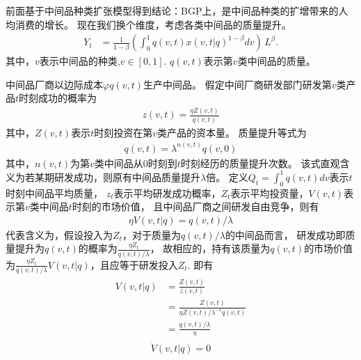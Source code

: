 \documentclass[cn,normal,11pt,black]{elegantnote}
\begin{document}
\begin{definition}[最终品生产函数]
    前面基于中间品种类扩张模型得到结论：BGP上，是中间品种类的扩增带来的人均消费的增长。
    现在我们换个维度，考虑各类中间品的质量提升。
    \begin{align}
        Y_{t} & = \frac{1}{1-\beta} \left(\int_0^1 q(v,t) x(v,t|q)^{1-\beta} dv \right) \, L^\beta.
    \end{align}
    其中，$v$表示中间品的种类,$v \in [0,1]$.
    $q(v,t)$表示第$v$类中间品的质量。    
\end{definition}

\begin{definition}[中间品厂商]
    中间品厂商以边际成本$\varphi q(v,t)$生产中间品。
    假定中间厂商研发部门研发第$v$类产品$t$时刻成功的概率为
    \begin{align}
       z(v,t) = \frac{\eta Z(v,t)}{q(v,t)}
    \end{align}
    其中，$Z(v,t)$表示$t$时刻投资在第$v$类产品的资本量。
    质量提升等式为
    \begin{align}
        q(v, t) = \lambda^{n(v, t)} q(v, 0)
    \end{align}
    其中，$n(v,t)$为第$v$类中间品从0时刻到$t$时刻经历的质量提升次数。
    该式直观含义为若某期研发成功，则原有中间品质量提升$\lambda$倍。
    定义$Q_t = \int_0^1 q(v,t) dv$表示$t$时刻中间品平均质量，
    $z_t$表示平均研发成功概率，$Z_t$表示平均投资量，$V(v,t)$表示第$v$类中间品$t$时刻的市场价值，
    且中间品厂商之间研发自由竞争，则有
    \begin{align}
        \eta V(v,t|q) =  q(v,t) / \lambda
    \end{align}
    代表含义为，假设投入为$Z_t$，对于质量为$q(v,t)/\lambda$的中间品而言，
    研发成功即质量提升为$q(v,t)$的概率为$\frac{\eta Z_t}{q(v,t) / \lambda}$，
    故相应的，持有该质量为$q(v,t)$的市场价值为$\frac{\eta Z_t}{q(v,t) / \lambda} V(v,t|q)$，且应等于研发投入$Z_t$.
    即有
    \begin{align}\label{vqual}
        \begin{aligned}
           V(v,t|q) &= \frac{Z(v,t)}{z(v,t)} \\
                    &= \frac{Z(v,t)}{\eta Z(v,t)/ \lambda^{-1} q(v,t)} \\
                    &= \frac{q(v,t)/\lambda}{\eta}
        \end{aligned}
    \end{align}
    \begin{equation}\label{dotvqual}
       \dot{V}(v,t|q) = 0 
    \end{equation}
\end{definition}
\end{document}
